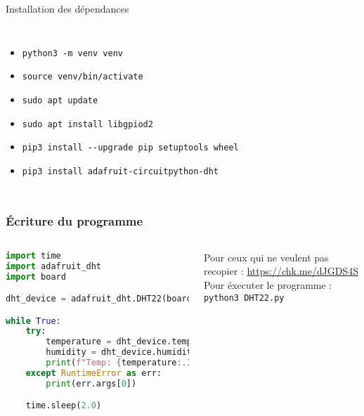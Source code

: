 \documentclass[aspectratio=169,xcolor=dvipsnames]{beamer}
\begin{document}
\begin{frame}{Installation des dépendances}
    \begin{columns}[c] %

        \begin{itemize}
            \item \texttt{python3 -m venv venv}
            \item \texttt{source venv/bin/activate}
            \item \texttt{sudo apt update}
            \item \texttt{sudo apt install libgpiod2}
            \item \texttt{pip3 install -{}-upgrade pip setuptools wheel}
            \item \texttt{pip3 install adafruit-circuitpython-dht}
        \end{itemize}

    \end{columns}
\end{frame}

\begin{frame}[fragile]
\frametitle{Écriture du programme}
    \begin{columns}[c] %

        \begin{lstlisting}[language=Python, caption=DHT22.py]
import time
import adafruit_dht
import board

dht_device = adafruit_dht.DHT22(board.D4)

while True:
    try:
        temperature = dht_device.temperature
        humidity = dht_device.humidity
        print(f"Temp: {temperature:.1f}C / Humi: {humidity:.1f}%")
    except RuntimeError as err:
        print(err.args[0])

    time.sleep(2.0)
        \end{lstlisting}

        Pour ceux qui ne veulent pas recopier :
        \url{https://chk.me/dJGDS4S} \\
        \vspace{5mm}
        Pour éxecuter le programme :
        \texttt{python3 DHT22.py}
    \end{columns}
\end{frame}
\end{document}
